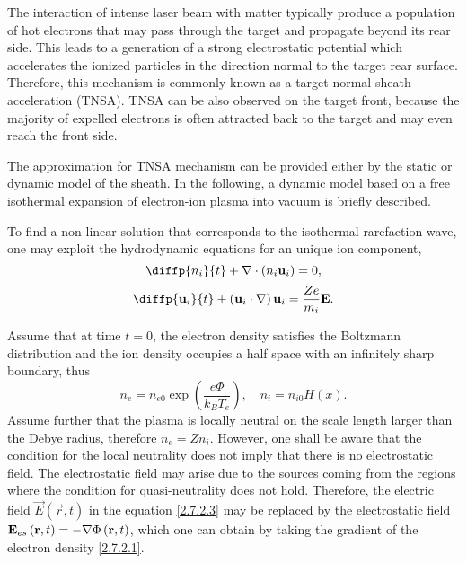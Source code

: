 The interaction of intense laser beam with matter typically produce a population of hot electrons that may pass through the target and propagate beyond its rear side. This leads to a generation of a strong electrostatic potential which accelerates the ionized particles in the direction normal to the target rear surface. Therefore, this mechanism is commonly known as a target normal sheath acceleration (TNSA). TNSA can be also observed on the target front, because the majority of expelled electrons is often attracted back to the target and may even reach the front side.

The approximation for TNSA mechanism can be provided either by the static or dynamic model of the sheath. In the following, a dynamic model based on a free isothermal expansion of electron-ion plasma into vacuum is briefly described.

To find a non-linear solution that corresponds to the isothermal rarefaction wave, one may exploit the hydrodynamic equations for an unique ion component,
\begin{equation}
\label{2.7.2.2}
\diffp{n_i}{t} + \div{\left(n_i \vec{u}_i\right)} = 0,
\end{equation}
\begin{equation}
\label{2.7.2.3}
\diffp{\vec{u}_i}{t} + \left(\vec{u}_i \cdot \grad{} \right) \vec{u}_i = \frac{Z e}{m_i} \vec{E}. 
\end{equation}

Assume that at time $ t = 0 $, the electron density satisfies the Boltzmann distribution and the ion density occupies a half space with an infinitely sharp boundary, thus
\begin{equation}
\label{2.7.2.1}
n_e = n_{e0} \exp{\left( \frac{e \Phi}{k_B T_e} \right)}, \quad n_i = n_{i0} H(x).
\end{equation}
Assume further that the plasma is locally neutral on the scale length larger than the Debye radius, therefore $ n_e = Z n_i $. However, one shall be aware that the condition for the local neutrality does not imply that there is no electrostatic field. The electrostatic field may arise due to the sources coming from the regions where the condition for quasi-neutrality does not hold. Therefore, the electric field  $ \vec{E} \left(\vec{r}, t\right) $ in the equation \ref{2.7.2.3} may be replaced by the electrostatic field $ \mathbf{E}_{es} \left(\mathbf{r}, t\right) = -\nabla \Phi \left(\mathbf{r}, t\right) $, which one can obtain by taking the gradient of the electron density \ref{2.7.2.1}.

